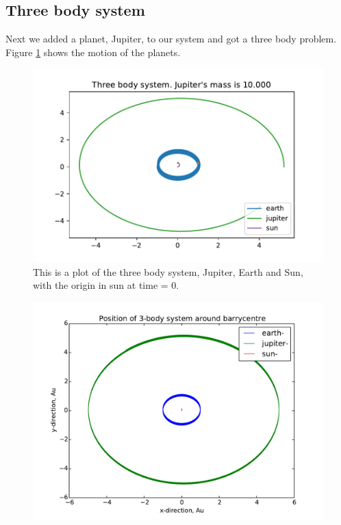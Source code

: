 \subsection{Three body system}

Next we added a planet, Jupiter, to our system and got a three body problem. Figure \ref{fig:three_body_sun_origin} shows the motion of the planets.

\begin{figure}[H]
\includegraphics[width=0.9\linewidth]{../results/plots/Jupitermass_is_1_0000_earth.pdf}\caption{This is a plot of the three body system, Jupiter, Earth and Sun, with the origin in sun at time = 0.}\label{fig:three_body_sun_origin}
\end{figure}



\begin{figure}
	\centering
	\includegraphics[width=0.9\linewidth]{../results/plots/3bodyCentric_position}
	\caption{}
	\label{fig:3bodycentricposition}
\end{figure}

